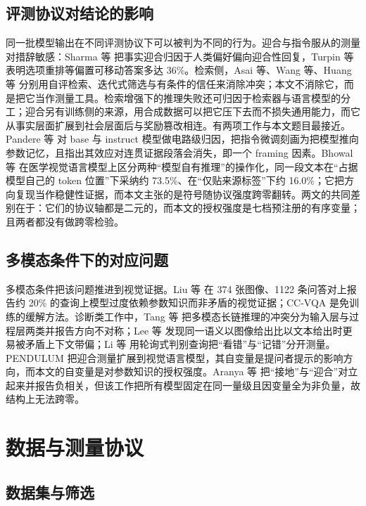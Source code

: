 \documentclass[10.5pt,compsoc,UTF8]{CjC}
\theoremstyle{mystyle}
\begin{document}
\subsection{评测协议对结论的影响}
\label{sec:2-3}

同一批模型输出在不同评测协议下可以被判为不同的行为。迎合与指令服从的测量对措辞敏感：Sharma 等\cite{ref8} 把事实迎合归因于人类偏好偏向迎合性回复，Turpin 等\cite{ref9} 表明选项重排等偏置可移动答案多达 36\%。检索侧，Asai 等\cite{ref24}、Wang 等\cite{ref22}、Huang 等\cite{ref23} 分别用自评检索、迭代式筛选与有条件的信任来消除冲突；本文不消除它，而是把它当作测量工具。检索增强下的推理失败还可归因于检索器与语言模型的分工\cite{ref25}；迎合另有训练侧的来源，用合成数据可以把它压下去而不损失通用能力\cite{ref41}，而它从事实层面扩展到社会层面后与奖励篡改相连\cite{ref42,ref43}。有两项工作与本文题目最接近。Pandere 等\cite{ref10} 对 base 与 instruct 模型做电路级归因，把指令微调刻画为把模型推向参数记忆，且指出其效应对连贯证据段落会消失，即一个 framing 因素。Bhowal 等\cite{ref15} 在医学视觉语言模型上区分两种“模型自有推理”的操作化，同一段文本在“占据模型自己的 token 位置”下采纳约 73.5\%、在“仅贴来源标签”下约 16.0\%；它把方向复现当作稳健性证据，而本文主张的是符号随协议强度跨零翻转。两文的共同差别在于：它们的协议轴都是二元的，而本文的授权强度是七档预注册的有序变量；且两者都没有做跨零检验。

\subsection{多模态条件下的对应问题}
\label{sec:2-4}

多模态条件把该问题推进到视觉证据。Liu 等\cite{ref11} 在 374 张图像、1122 条问答对上报告约 20\% 的查询上模型过度依赖参数知识而非矛盾的视觉证据；CC-VQA\cite{ref12} 是免训练的缓解方法。诊断类工作中，Tang 等\cite{ref13} 把多模态长链推理的冲突分为输入层与过程层两类并报告方向不对称；Lee 等\cite{ref14} 发现同一语义以图像给出比以文本给出时更易被矛盾上下文带偏；Li 等\cite{ref34} 用轮询式判别查询把“看错”与“记错”分开测量。PENDULUM\cite{ref3} 把迎合测量扩展到视觉语言模型，其自变量是提问者提示的影响方向，而本文的自变量是对参数知识的授权强度。Aranya 等\cite{ref16} 把“接地”与“迎合”对立起来并报告负相关，但该工作把所有模型固定在同一量级且因变量全为非负量，故结构上无法跨零。

\section{数据与测量协议}\label{sec:data}

\subsection{数据集与筛选}
\label{sec:4-1}
\end{document}
